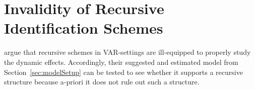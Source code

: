 \documentclass[a4paper,11pt,listof=nochaptergap,oneside,pointednumbers,bibtotoc,bigheadings,liststotoc,hidelinks]{scrbook}
\theoremstyle{mysatz}
\theoremstyle{mydefinition}
\theoremstyle{mytheorem}
\theoremstyle{mybemerkung}
\newcommand{\vect}[1]{\boldsymbol{\mathbf{#1}}}
\begin{document}
%

\section[Invalidity of Recursive Identification Schemes]{Invalidity of Recursive Identification Schemes}
\label{sec:ValidityRecursiveSchemes}
\citet{ludvigsonetal:18} argue that recursive schemes in VAR-settings are ill-equipped to properly study the dynamic effects. Accordingly, their suggested and estimated model from Section~\ref{sec:modelSetup} can be tested to see whether it supports a recursive structure because a-priori it does not rule out such a structure. 
\end{document}
